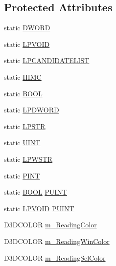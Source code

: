 \subsection*{Protected Attributes}
\begin{DoxyCompactItemize}
\item 
static \hyperlink{class_c_d_x_u_t_i_m_e_edit_box_a4666fce9b285d692ceb0515bf2dbde90}{DWORD}
\item 
static \hyperlink{class_c_d_x_u_t_i_m_e_edit_box_a1fb0e05d8b96c531c1b69d06391b21f7}{LPVOID}
\item 
static \hyperlink{class_c_d_x_u_t_i_m_e_edit_box_aad569bc50d5e5e35422883375e07ff36}{LPCANDIDATELIST}
\item 
static \hyperlink{class_c_d_x_u_t_i_m_e_edit_box_aa9afdec726ecd526e2a0abc01537426c}{HIMC}
\item 
static \hyperlink{class_c_d_x_u_t_i_m_e_edit_box_ad2239c74ad7d59cbb8e6d2b5bf17bcb8}{BOOL}
\item 
static \hyperlink{class_c_d_x_u_t_i_m_e_edit_box_a13c133202b7126d255528d5573500007}{LPDWORD}
\item 
static \hyperlink{class_c_d_x_u_t_i_m_e_edit_box_ab59f6a19cb5a1ca421bcb075676ec5f1}{LPSTR}
\item 
static \hyperlink{class_c_d_x_u_t_i_m_e_edit_box_a7c83b549328a07897bdac88bb0ac4d68}{UINT}
\item 
static \hyperlink{class_c_d_x_u_t_i_m_e_edit_box_ab64b30f7dfad94f5fdffbe58821da2ff}{LPWSTR}
\item 
static \hyperlink{class_c_d_x_u_t_i_m_e_edit_box_a96f42b574c3273edb514d6490a7fee62}{PINT}
\item 
static \hyperlink{class_c_d_x_u_t_i_m_e_edit_box_ad2239c74ad7d59cbb8e6d2b5bf17bcb8}{BOOL} \hyperlink{class_c_d_x_u_t_i_m_e_edit_box_a0bcfcce05c77e66c32a46c02ae6bbed0}{PUINT}
\item 
static \hyperlink{class_c_d_x_u_t_i_m_e_edit_box_a1fb0e05d8b96c531c1b69d06391b21f7}{LPVOID} \hyperlink{class_c_d_x_u_t_i_m_e_edit_box_a866116315de54f6b982526a070d01fdd}{PUINT}
\item 
D3DCOLOR \hyperlink{class_c_d_x_u_t_i_m_e_edit_box_a5963bda0b88c359e6360b437abd86e7f}{m\_\-ReadingColor}
\item 
D3DCOLOR \hyperlink{class_c_d_x_u_t_i_m_e_edit_box_a9971f0c9b8a12a60884ccbe75667550d}{m\_\-ReadingWinColor}
\item 
D3DCOLOR \hyperlink{class_c_d_x_u_t_i_m_e_edit_box_a9e4793780d2c6cf0819d3d0d277df0a0}{m\_\-ReadingSelColor}
\item 

\end{DoxyCompactItemize}
